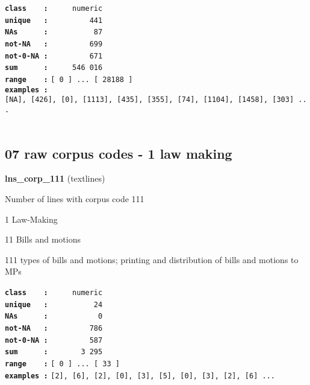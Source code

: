 \documentclass[]{article}
\begin{document}
\textbf{\texttt{class\ \ \ \ :}} \texttt{~~~~~numeric}\\
\textbf{\texttt{unique\ \ \ :}} \texttt{~~~~~~~~~441}\\
\textbf{\texttt{NAs\ \ \ \ \ \ :}} \texttt{~~~~~~~~~~87}\\
\textbf{\texttt{not-NA\ \ \ :}} \texttt{~~~~~~~~~699}\\
\textbf{\texttt{not-0-NA\ :}} \texttt{~~~~~~~~~671}\\
\textbf{\texttt{sum\ \ \ \ \ \ :}} \texttt{~~~~~546~016}\\
\textbf{\texttt{range\ \ \ \ :}}
\texttt{{[}\ 0\ {]}\ ...\ {[}\ 28188\ {]}}\\
\textbf{\texttt{examples\ :}}
\texttt{{[}NA{]},\ {[}426{]},\ {[}0{]},\ {[}1113{]},\ {[}435{]},\ {[}355{]},\ {[}74{]},\ {[}1104{]},\ {[}1458{]},\ {[}303{]}\ ...}\\

~

\subsection{07 raw corpus codes - 1 law
making}\label{raw-corpus-codes---1-law-making}

\textbf{lns\_corp\_111} (textlines)

Number of lines with corpus code 111

1 Law-Making

11 Bills and motions

111 types of bills and motions; printing and distribution of bills and
motions to MPs

\textbf{\texttt{class\ \ \ \ :}} \texttt{~~~~~numeric}\\
\textbf{\texttt{unique\ \ \ :}} \texttt{~~~~~~~~~~24}\\
\textbf{\texttt{NAs\ \ \ \ \ \ :}} \texttt{~~~~~~~~~~~0}\\
\textbf{\texttt{not-NA\ \ \ :}} \texttt{~~~~~~~~~786}\\
\textbf{\texttt{not-0-NA\ :}} \texttt{~~~~~~~~~587}\\
\textbf{\texttt{sum\ \ \ \ \ \ :}} \texttt{~~~~~~~3~295}\\
\textbf{\texttt{range\ \ \ \ :}}
\texttt{{[}\ 0\ {]}\ ...\ {[}\ 33\ {]}}\\
\textbf{\texttt{examples\ :}}
\texttt{{[}2{]},\ {[}6{]},\ {[}2{]},\ {[}0{]},\ {[}3{]},\ {[}5{]},\ {[}0{]},\ {[}3{]},\ {[}2{]},\ {[}6{]}\ ...}\\

~
\end{document}
